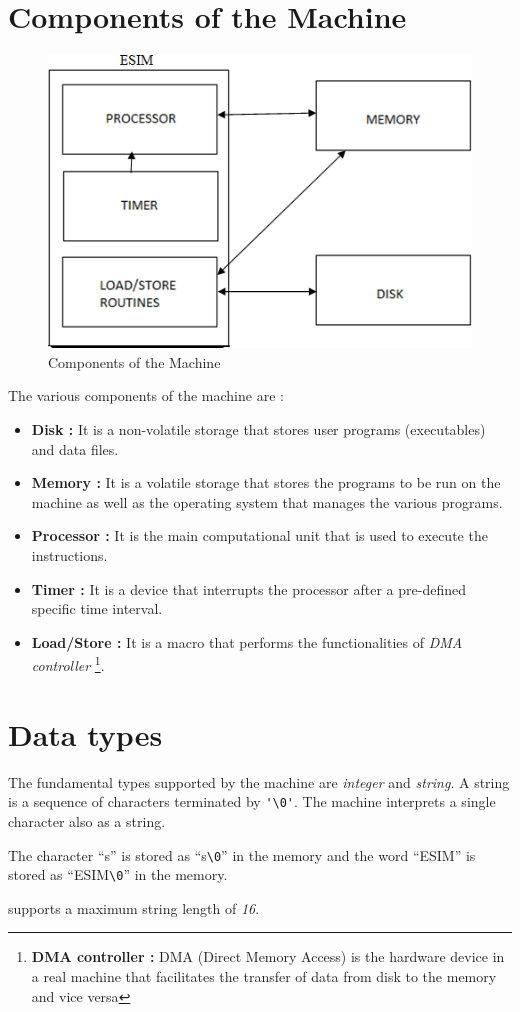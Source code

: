 \section{Components of the Machine}
\begin{figure}[ht!]
	\centering
	\includegraphics[scale=0.5]{pics/components_machine}
	\caption{Components of the Machine}
	\label{fig:components}
\end{figure}

The various components of the machine are :
\begin{itemize}
	\item \textbf{Disk :} It is a non-volatile storage that stores user programs (executables) and data files. 
	\item \textbf{Memory :} It is a volatile storage that stores the programs to be run on the machine as well as the operating system that manages the various programs. 
	\item \textbf{Processor :} It is the main computational unit that is used to execute the instructions. 
	\item \textbf{Timer :} It is a device that interrupts the processor after a pre-defined specific time interval. 
	\item \textbf{Load/Store :} It is a macro that performs the functionalities of \emph{DMA controller} 
	\footnote{\textbf{DMA controller :} DMA (Direct Memory Access) is the hardware device in a real machine that facilitates the transfer of data from disk to the memory and vice versa}.
\end{itemize}

\section{Data types}
The fundamental types supported by the machine are \textit{integer} and \textit{string}.
A string is a sequence of characters terminated by \verb|'\0'|. The machine interprets a single character also as a string.
\begin{example}
	The character ``s'' is stored as ``s\verb|\0|'' in the memory and the word ``ESIM'' is stored as ``ESIM\verb|\0|'' in the memory.
\end{example}
\ESIM supports a maximum string length of \emph{16}.
